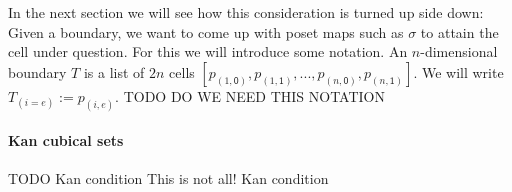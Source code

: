\documentclass[11pt]{article}
\theoremstyle{definition}
\newcommand{\mdef}{:=}
\newcommand{\mlist}[1]{[ {#1} ]}
\newcommand{\pintrestr}[3]{\mathbf{1}^{#1}_{{#2}={#3}}}
\newcommand{\izero}{\mathsf{0}}
\newcommand{\ione}{\mathsf{1}}
\newcommand{\restrict}[2]{{#1}|_{#2}}
\newcommand{\dmap}[2]{d^{({#1} , {#2})}}
\newcommand{\cont}[2]{ \ifthenelse{\equal{#2}{}}{#1}{{#1}\langle{#2}\rangle} }
\newcommand{\comp}[2]{\mathsf{Comp}({#1}\ {#2})}
\begin{document}


In the next section we will see how this consideration is turned up side down:
Given a boundary, we want to come up with poset maps such as $\sigma$ to attain
the cell under question. For this we will introduce some notation. An
$n$-dimensional boundary $T$ is a list of $2n$ cells $\mlist{p_{(1,\izero)},
  p_{(1,\ione)} , ... , p_{(n,\izero)}, p_{(n, \ione)}}$. We will write
$T_{(i=e)} \mdef p_{(i,e)}$. TODO DO WE NEED THIS NOTATION

\paragraph{Kan cubical sets}


TODO Kan condition
This is not all! Kan condition








\end{document}
